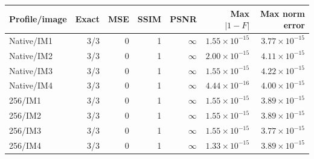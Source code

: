 \begin{center}
{\small
\setlength{\tabcolsep}{4pt}
\begin{tabular}{@{}lrrrrrr@{}}
\toprule
Profile/image & Exact & MSE & SSIM & PSNR & Max $|1-F|$ & Max norm error \\
\midrule
Native/IM1 & 3/3 & 0 & 1 & $\infty$ & $1.55\times10^{-15}$ & $3.77\times10^{-15}$ \\
Native/IM2 & 3/3 & 0 & 1 & $\infty$ & $2.00\times10^{-15}$ & $4.11\times10^{-15}$ \\
Native/IM3 & 3/3 & 0 & 1 & $\infty$ & $1.55\times10^{-15}$ & $4.22\times10^{-15}$ \\
Native/IM4 & 3/3 & 0 & 1 & $\infty$ & $4.44\times10^{-16}$ & $4.00\times10^{-15}$ \\
256/IM1 & 3/3 & 0 & 1 & $\infty$ & $1.55\times10^{-15}$ & $3.89\times10^{-15}$ \\
256/IM2 & 3/3 & 0 & 1 & $\infty$ & $1.55\times10^{-15}$ & $3.89\times10^{-15}$ \\
256/IM3 & 3/3 & 0 & 1 & $\infty$ & $1.55\times10^{-15}$ & $3.77\times10^{-15}$ \\
256/IM4 & 3/3 & 0 & 1 & $\infty$ & $1.33\times10^{-15}$ & $3.89\times10^{-15}$ \\
\bottomrule
\end{tabular}}
\end{center}
